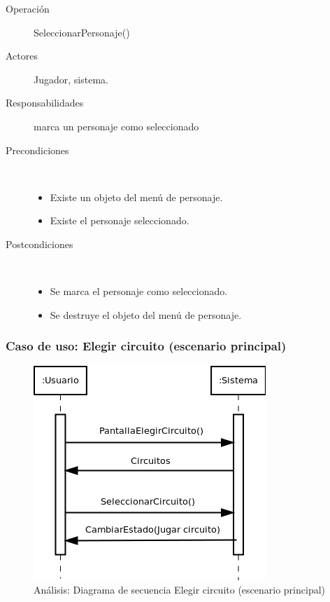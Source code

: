 \begin{description}
    \item [Operación] SeleccionarPersonaje()
    \item [Actores] Jugador, sistema.
    \item [Responsabilidades] marca un personaje como seleccionado
    \item [Precondiciones] $\quad$
        \begin{itemize}
            \item Existe un objeto del menú de personaje.
            \item Existe el personaje seleccionado.
        \end{itemize}
    \item [Postcondiciones] $\quad$
        \begin{itemize}
            \item Se marca el personaje como seleccionado.
            \item Se destruye el objeto del menú de personaje.
        \end{itemize}
\end{description}

\subsubsection{Caso de uso: Elegir circuito (escenario principal)}

\begin{figure}[H] 
  \label{secuencia_elegir_circuito}
  \begin{center}
    \includegraphics[scale=0.7]{imagenes/analisis/secuencia_elegir_circuito.png}
  \end{center}
  \caption{Análisis: Diagrama de secuencia Elegir circuito (escenario principal)}
\end{figure}

